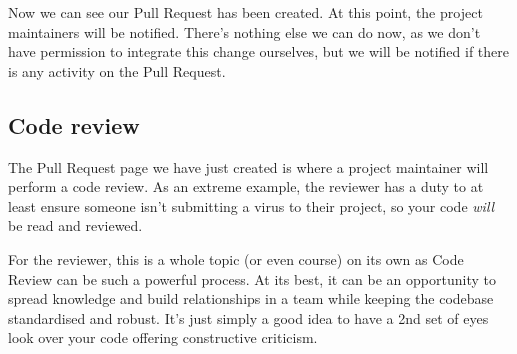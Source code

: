 \documentclass[
  letterpaper,
  DIV=11,
  numbers=noendperiod]{scrartcl}
\begin{document}
Now we can see our Pull Request has been created. At this point, the
project maintainers will be notified. There's nothing else we can do
now, as we don't have permission to integrate this change ourselves, but
we will be notified if there is any activity on the Pull Request.

\hypertarget{code-review}{%
\subsection{Code review}\label{code-review}}

The Pull Request page we have just created is where a project maintainer
will perform a code review. As an extreme example, the reviewer has a
duty to at least ensure someone isn't submitting a virus to their
project, so your code \emph{will} be read and reviewed.

For the reviewer, this is a whole topic (or even course) on its own as
Code Review can be such a powerful process. At its best, it can be an
opportunity to spread knowledge and build relationships in a team while
keeping the codebase standardised and robust. It's just simply a good
idea to have a 2nd set of eyes look over your code offering constructive
criticism.
\end{document}
